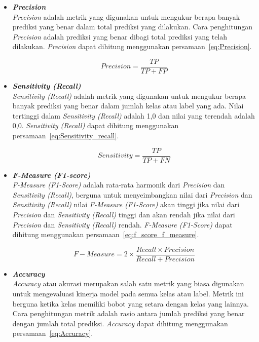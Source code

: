 \begin{itemize}
      \item \emph{\bfseries Precision}\\
      \emph{Precision} adalah metrik yang digunakan untuk mengukur berapa banyak prediksi yang benar
      dalam total prediksi yang dilakukan. Cara penghitungan \emph{Precision} adalah prediksi yang
      benar dibagi total prediksi yang telah dilakukan. \emph{Precision} dapat dihitung menggunakan
      persamaan~\ref{eq:Precision}.

      \begin{equation}\label{eq:Precision}
            Precision = \frac{TP}{TP + FP}
      \end{equation}

      \item \emph{\bfseries \emph{Sensitivity (Recall)}}\\
      \emph{Sensitivity (Recall)} adalah metrik yang digunakan untuk mengukur berapa banyak prediksi yang
      benar dalam jumlah kelas atau label yang ada. Nilai tertinggi dalam \emph{Sensitivity (Recall)}
      adalah 1,0 dan nilai yang terendah adalah 0,0. \emph{Sensitivity (Recall)} dapat dihitung menggunakan
      persamaan~\ref{eq:Sensitivity_recall}.

      \begin{equation}\label{eq:Sensitivity_recall}
            Sensitivity = \frac{TP}{TP + FN}
      \end{equation}

      \item \emph{\bfseries F-Measure (F1-score)}\\
      \emph{F-Measure (F1-Score)} adalah rata-rata harmonik dari \emph{Precision} dan \emph{Sensitivity (Recall)}, berguna
      untuk menyeimbangkan nilai dari \emph{Precision} dan \emph{Sensitivity (Recall)} nilai \emph{F-Measure (F1-Score)} akan
      tinggi jika nilai dari \emph{Precision} dan \emph{Sensitivity (Recall)} tinggi dan akan rendah jika nilai dari
      \emph{Precision} dan \emph{Sensitivity (Recall)} rendah. \emph{F-Measure (F1-Score)} dapat dihitung menggunakan
      persamaan~\ref{eq:f_score_f_measure}.

      \begin{equation}\label{eq:f_score_f_measure}
            F-Measure = 2 \times \frac{Recall \times Precision}{Recall + Precision}
      \end{equation}

      \item \emph{\bfseries Accuracy}\\
      \emph{Accuracy} atau akurasi merupakan salah satu metrik yang biasa digunakan untuk mengevaluasi
      kinerja model pada semua kelas atau label. Metrik ini berguna ketika kelas memiliki bobot yang
      setara dengan kelas yang lainnya. Cara penghitungan metrik adalah rasio antara jumlah prediksi
      yang benar dengan jumlah total prediksi. \emph{Accuracy} dapat dihitung menggunakan
      persamaan~\ref{eq:Accuracy}.


\end{itemize}
